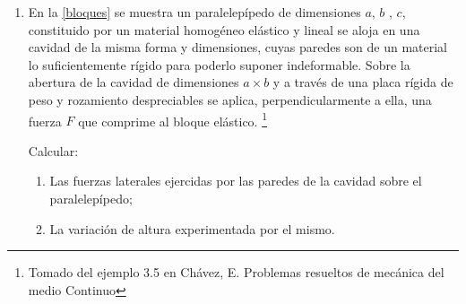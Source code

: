 \documentclass[../notas medios.tex]{subfiles}
\begin{document}
\begin{enumerate}
Y para el campo de desplazamientos es:
\begin{align*}
&u_{x} = \left(\frac{1}{G} - \frac{\nu}{E}\right)\frac{Py^3}{6I} + \left(\frac{l^2}{E} - \frac{x^2}{E} - \frac{c^2}{G} \right)\frac{Py}{2I} \enspace ,\\
&u_{y} = \frac{\nu P xy^2}{2EI} + \frac{Px^3}{6EI} - \frac{Pl^2x}{2EI} + \frac{Pl^3}{3EI} \enspace ,
\end{align*} \\
en donde $G=E/(2 + 2\nu)$ es el m\'odulo de cortante e $I$ es el momento de inercia.

\begin{figure}[h]
	\centering
	\texttt{[image: Viga\_Voladizo.pdf]} 
	\caption{Viga en voladizo con una carga distribuida en su extremo.}
	\label{fig:viga}
\end{figure}

\begin{enumerate}
\item Determinar las condiciones de frontera del problema.
\item Verificar que las soluciones de esfuerzos y desplazamientos satisfacen las condiciones de frontera.
\item Encontrar la regi\'on de la viga que est\'a a compresi\'on y la regi\'on tensi\'on, y por tanto el eje neutro. Y determinar la ecuaci\'on de desplazamientos para este eje neutro. Comparar con la teor\'ia cl\'asica de vigas.
\end{enumerate}

\newpage
\item \label{punto05_m} En la  \cref{bloques} se muestra un paralelep\'ipedo de dimensiones $a$, $b$ , $c$, constituido por un material homog\'eneo el\'astico y lineal se aloja en una cavidad de la misma forma y dimensiones, cuyas paredes son de un material lo suficientemente r\'igido para poderlo suponer indeformable.
Sobre la abertura de la cavidad de dimensiones $a\times b$ y a trav\'es de una placa r\'igida de peso y rozamiento despreciables se aplica, perpendicularmente a ella, una fuerza $F$ que comprime al bloque el\'astico. \footnote{Tomado del ejemplo 3.5 en Chávez, E. Problemas resueltos de mecánica del medio Continuo}

Calcular:
\begin{enumerate}
\item Las fuerzas laterales ejercidas por las paredes de la cavidad sobre el paralelep\'ipedo;
\item La variaci\'on de altura experimentada por el mismo.
\end{enumerate}


\end{enumerate}
\end{document}
